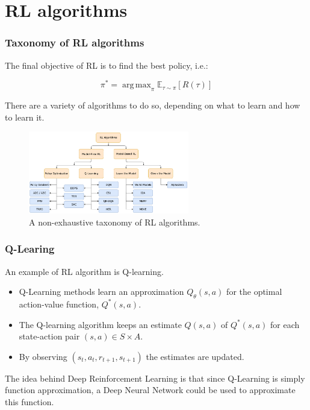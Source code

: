 \documentclass[10pt]{beamer}
\newcommand{\E}{{\mathbb E}}
\DeclareMathOperator*{\argmax}{arg\,max}
\begin{document}

\section{RL algorithms}


\begin{frame}
	\frametitle{Taxonomy of RL algorithms}
	The final objective of RL is to find the best policy, i.e.:

	\begin{equation}
		\pi^* = \argmax_\pi \E_{\tau \sim \pi}{[R(\tau)]}
		\label{eq:objective}
	\end{equation}
	

	There are a variety of algorithms to do so, depending on what to learn and how to learn it.

	\begin{figure}[h]
		\centering
		\includegraphics[width=7cm]{rl-taxonomy.png}
		\caption{A non-exhaustive taxonomy of RL algorithms. \cite{SpinningUp2018}}
		\label{fig:rl-taxonomy}
	\end{figure}

\end{frame}


\begin{frame}
	\frametitle{Q-Learing}
	An example of RL algorithm is Q-learning.\\
	\begin{itemize}
		\item Q-Learning methods learn an approximation $Q_{\theta}(s,a)$ for the optimal action-value function, $Q^*(s,a)$.
		\item The Q-learning algorithm keeps an estimate $Q(s,a)$ of $Q^*(s,a)$ for each state-action pair $(s,a) \in S \times A$.
		\item By observing $(s_t, a_t, r_{t+1}, s_{t+1})$ the estimates are updated.
	\end{itemize}
	
	The idea behind Deep Reinforcement Learning is that since Q-Learning is simply function approximation, a Deep Neural Network could be used to approximate this function. 

\end{frame}
\end{document}
